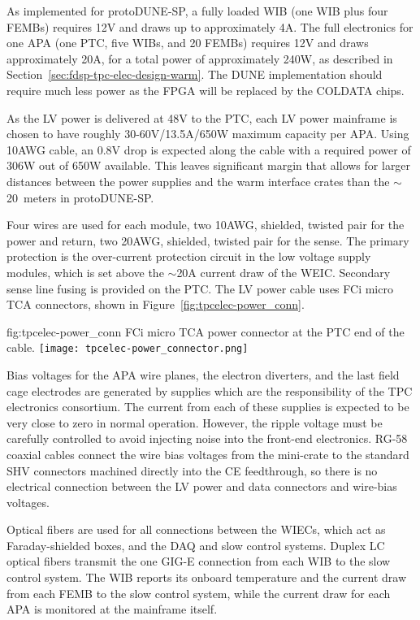 As implemented for protoDUNE-SP, a fully loaded WIB (one WIB plus four FEMBs) requires
12V and draws up to approximately 4A. The full electronics for one APA (one PTC, five WIBs, and 20 FEMBs) 
requires 12V and draws approximately 20A, for a total power of approximately 240W, as 
described in Section~\ref{sec:fdsp-tpc-elec-design-warm}. The DUNE implementation should require much 
less power as the FPGA will be replaced by the COLDATA chips.

As the LV power is delivered at 48V to the PTC, each LV power mainframe is chosen to have 
roughly 30-60V/13.5A/650W maximum capacity per APA. Using 10AWG cable, an 0.8V drop is 
expected along the cable with a required power of 306W out of 650W available.  
This leaves significant margin that allows for larger distances between the power supplies and 
the warm interface crates than the $\sim$20~meters in protoDUNE-SP.

Four wires are used for each module, two 10AWG,
shielded, twisted pair for the power and return, two 20AWG, shielded, twisted pair for the sense.
The primary protection is the over-current protection circuit in the low voltage supply modules, 
which is set above the $\sim$20A current draw of the WEIC.  Secondary sense line fusing is 
provided on the PTC.  The LV power cable uses FCi micro TCA connectors, shown in
Figure~\ref{fig:tpcelec-power_conn}.

\begin{dunefigure}
{fig:tpcelec-power_conn}
{FCi micro TCA power connector at the PTC end of the cable.}
\texttt{[image: tpcelec-power\_connector.png]}
\end{dunefigure}

Bias voltages for the APA wire planes, the electron diverters, and the last field cage electrodes are generated by supplies which are the responsibility of the TPC electronics consortium.  The current from each of these supplies is expected to be very close to zero in normal operation.  However, the ripple voltage must be carefully controlled to avoid injecting noise into the front-end electronics.  RG-58 coaxial cables connect the wire bias voltages from the mini-crate to the standard SHV
connectors machined directly into the CE feedthrough, so there is no electrical connection between 
the LV power and data connectors and wire-bias voltages.

Optical fibers are used for all connections between the WIECs, which act as
Faraday-shielded boxes, and the DAQ and slow control systems.  Duplex LC optical fibers
transmit the one GIG-E connection from each WIB to the slow control system.  The WIB reports
its onboard temperature and the current draw from each FEMB to the slow control system, while the
current draw for each APA is monitored at the mainframe itself.
